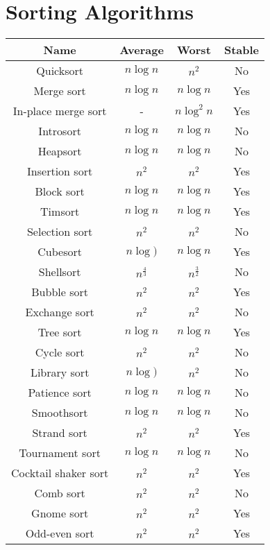 \documentclass{article}
\begin{document}

\newpage
\section*{Sorting Algorithms}

\begin{table}[ht]
	\centering
	\scriptsize
	\begin{tabular}{cccc}
		Name & Average & Worst & Stable\\
		\hline
		Quicksort & $n\log{n}$ & $n^2$ & No\\
		Merge sort & $n\log{n}$ & $n\log{n}$ & Yes\\
		In-place merge sort & - & $n\log^2{n}$ & Yes\\
		Introsort & $n\log{n}$ & $n\log{n}$ & No\\
		Heapsort & $n\log{n}$ & $n\log{n}$ & No\\
		Insertion sort & $n^2$ & $n^2$ & Yes\\
		Block sort & $n\log{n}$ & $n\log{n}$ & Yes\\
		Timsort & $n\log{n}$ & $n\log{n}$ & Yes\\
		Selection sort & $n^2$ & $n^2$ & No\\
		Cubesort & $n\log{)}$ & $n\log{n}$ & Yes\\
		Shellsort & $n^{\frac{4}{3}}$ & $n^{\frac{3}{2}}$ & No\\
		Bubble sort & $n^2$ & $n^2$ & Yes\\
		Exchange sort & $n^2$ & $n^2$ & No\\
		Tree sort & $n\log{n}$ & $n\log{n}$ & Yes\\
		Cycle sort & $n^2$ & $n^2$ & No\\
		Library sort & $n\log{)}$ & $n^2$ & No\\
		Patience sort & $n\log{n}$ & $n\log{n}$ & No\\
		Smoothsort & $n\log{n}$ & $n\log{n}$ & No\\
		Strand sort & $n^2$ & $n^2$ & Yes\\
		Tournament sort & $n\log{n}$ & $n\log{n}$ & No\\
		Cocktail shaker sort & $n^2$ & $n^2$ & Yes\\
		Comb sort & $n^2$ & $n^2$ & No\\
		Gnome sort & $n^2$ & $n^2$ & Yes\\
		Odd-even sort & $n^2$ & $n^2$ & Yes\\
		\hline
	\end{tabular}
\end{table}
\end{document}
